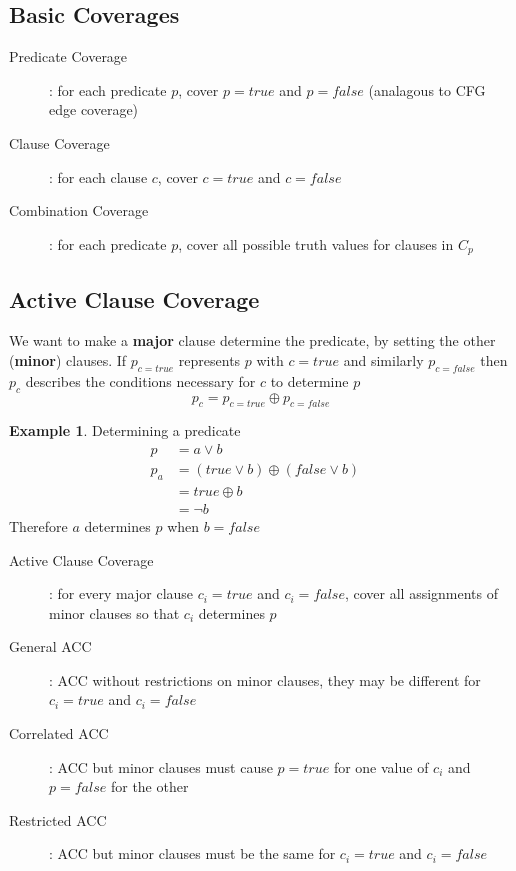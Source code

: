 \documentclass[]{article}
\theoremstyle{definition}
\newtheorem{ex}{Example}[section]
\begin{document}
		\subsection{Basic Coverages}
		\begin{description}
			\item[Predicate Coverage]: for each predicate $p$, cover $p = true$ and $p = false$ (analagous to CFG edge coverage)
			\item[Clause Coverage]: for each clause $c$, cover $c = true$ and $c = false$ 
			\item[Combination Coverage]: for each predicate $p$, cover all possible truth values for clauses in $C_p$ 
		\end{description}
		\subsection{Active Clause Coverage}
		We want to make a \textbf{major} clause determine the predicate, by setting the other (\textbf{minor}) clauses.
		If $p_{c=true}$ represents $p$ with $c = true$ and similarly $p_{c=false}$ then $p_c$ describes the conditions necessary
		for $c$ to determine $p$
		\begin{equation*}
			p_c = p_{c=true} \oplus p_{c=false}
		\end{equation*}

		\begin{ex}
			Determining a predicate
			\begin{align*}
				p &= a \lor b & \\
				p_a &= (true \lor b) \oplus (false \lor b) & \\
				&= true \oplus b & \\
				&= \neg b &
			\end{align*}
			Therefore $a$ determines $p$ when $b = false$
		\end{ex}

		\begin{description}
			\item[Active Clause Coverage]: for every major clause $c_i = true$ and $c_i = false$, cover all assignments of minor clauses so that $c_i$ determines $p$ 
			\item[General ACC]: ACC without restrictions on minor clauses, they may be different for $c_i = true$ and $c_i = false$
			\item[Correlated ACC]: ACC but minor clauses must cause $p = true$ for one value of $c_i$ and $p = false$ for the other
			\item[Restricted ACC]: ACC but minor clauses must be the same for $c_i = true$ and $c_i = false$
		\end{description}
\end{document}
